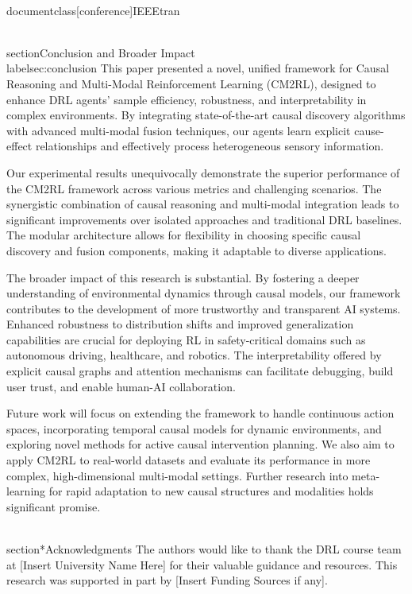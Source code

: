 \\documentclass[conference]{IEEEtran}
\begin{document}
\\section{Conclusion and Broader Impact}
\\label{sec:conclusion}
This paper presented a novel, unified framework for Causal Reasoning and Multi-Modal Reinforcement Learning (CM2RL), designed to enhance DRL agents' sample efficiency, robustness, and interpretability in complex environments. By integrating state-of-the-art causal discovery algorithms with advanced multi-modal fusion techniques, our agents learn explicit cause-effect relationships and effectively process heterogeneous sensory information.

Our experimental results unequivocally demonstrate the superior performance of the CM2RL framework across various metrics and challenging scenarios. The synergistic combination of causal reasoning and multi-modal integration leads to significant improvements over isolated approaches and traditional DRL baselines. The modular architecture allows for flexibility in choosing specific causal discovery and fusion components, making it adaptable to diverse applications.

The broader impact of this research is substantial. By fostering a deeper understanding of environmental dynamics through causal models, our framework contributes to the development of more trustworthy and transparent AI systems. Enhanced robustness to distribution shifts and improved generalization capabilities are crucial for deploying RL in safety-critical domains such as autonomous driving, healthcare, and robotics. The interpretability offered by explicit causal graphs and attention mechanisms can facilitate debugging, build user trust, and enable human-AI collaboration.

Future work will focus on extending the framework to handle continuous action spaces, incorporating temporal causal models for dynamic environments, and exploring novel methods for active causal intervention planning. We also aim to apply CM2RL to real-world datasets and evaluate its performance in more complex, high-dimensional multi-modal settings. Further research into meta-learning for rapid adaptation to new causal structures and modalities holds significant promise.

\\section*{Acknowledgments}
The authors would like to thank the DRL course team at [Insert University Name Here] for their valuable guidance and resources. This research was supported in part by [Insert Funding Sources if any].
\end{document}
